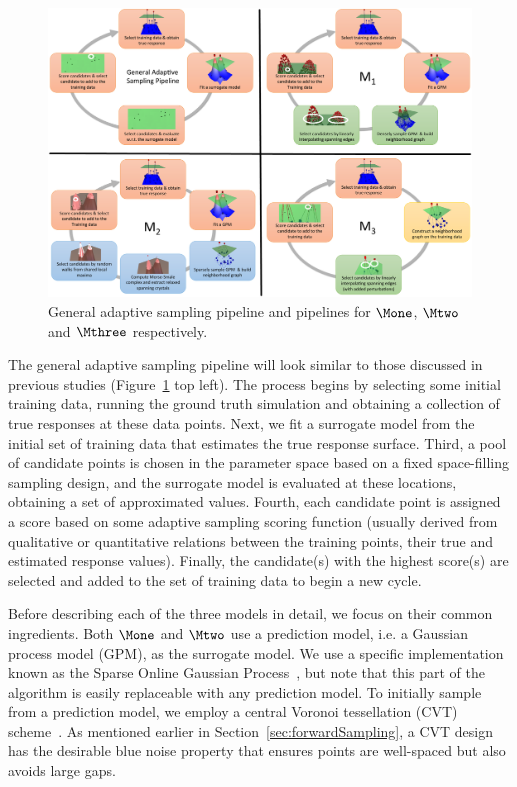\begin{figure}[!ht]
\centering
\includegraphics[width=1.0\textwidth]{figs/chap5/pipelines}
\caption{General adaptive sampling pipeline and pipelines for $\protect\Mone$, $\protect\Mtwo$ and $\protect\Mthree$ respectively.}
\label{fig:pipelines}
\end{figure}

The general adaptive sampling pipeline will look similar to those discussed in previous studies (Figure~\ref{fig:pipelines} top left).
%
The process begins by selecting some initial training data, running the ground truth simulation and obtaining a collection of true responses at these data points.
%
Next, we fit a surrogate model from the initial set of training data that estimates the true response surface.
%
Third, a pool of candidate points is chosen in the parameter space based on a fixed space-filling sampling design, and the surrogate model is evaluated at these locations, obtaining a set of approximated values.
%
Fourth, each candidate point is assigned a score based on some adaptive sampling scoring function (usually derived from qualitative or quantitative relations between the training points, their true and estimated response values).
%
Finally, the candidate(s) with the highest score(s) are selected and added to the set of training data to begin a new cycle.

Before describing each of the three models in detail, we focus on their common ingredients.
%
%
Both $\Mone$ and $\Mtwo$ use a prediction model, i.e. a Gaussian process model (GPM), as the surrogate model.
%
We use a specific implementation known as the Sparse Online Gaussian Process~\cite{CsatoOpper2002}, but note that this part of the algorithm is easily replaceable with any prediction model.
%
To initially sample from a prediction model, we employ a central Voronoi tessellation (CVT)
scheme~\cite{DuFaberGunzburger1999}.
%
As mentioned earlier in Section~\ref{sec:forwardSampling}, a CVT design has the desirable blue noise property that ensures points are well-spaced but also avoids large gaps.

